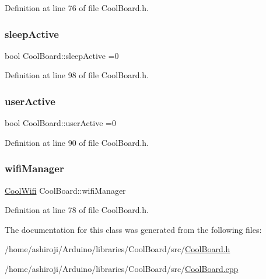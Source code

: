 Definition at line 76 of file Cool\+Board.\+h.

\mbox{\label{class_cool_board_a0a51b2287139f66c738101fb53139230}} 
\subsubsection{\texorpdfstring{sleep\+Active}{sleepActive}}
{\footnotesize\ttfamily bool Cool\+Board\+::sleep\+Active =0\hspace{0.3cm}{\ttfamily [private]}}



Definition at line 98 of file Cool\+Board.\+h.

\mbox{\label{class_cool_board_a6395459131d6889a3005f79c7a35e964}} 
\subsubsection{\texorpdfstring{user\+Active}{userActive}}
{\footnotesize\ttfamily bool Cool\+Board\+::user\+Active =0\hspace{0.3cm}{\ttfamily [private]}}



Definition at line 90 of file Cool\+Board.\+h.

\mbox{\label{class_cool_board_acd88e6003606b47479ebba81e4aceeca}} 
\subsubsection{\texorpdfstring{wifi\+Manager}{wifiManager}}
{\footnotesize\ttfamily \hyperlink{class_cool_wifi}{Cool\+Wifi} Cool\+Board\+::wifi\+Manager\hspace{0.3cm}{\ttfamily [private]}}



Definition at line 78 of file Cool\+Board.\+h.



The documentation for this class was generated from the following files\+:\begin{DoxyCompactItemize}
\item 
/home/ashiroji/\+Arduino/libraries/\+Cool\+Board/src/\hyperlink{_cool_board_8h}{Cool\+Board.\+h}\item 
/home/ashiroji/\+Arduino/libraries/\+Cool\+Board/src/\hyperlink{_cool_board_8cpp}{Cool\+Board.\+cpp}\end{DoxyCompactItemize}
